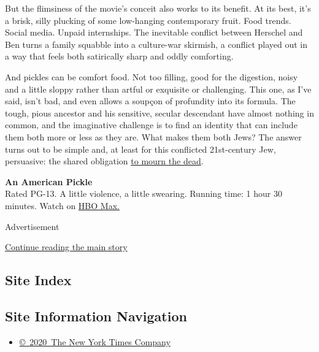 But the flimsiness of the movie's conceit also works to its benefit. At
its best, it's a brisk, silly plucking of some low-hanging contemporary
fruit. Food trends. Social media. Unpaid internships. The inevitable
conflict between Herschel and Ben turns a family squabble into a
culture-war skirmish, a conflict played out in a way that feels both
satirically sharp and oddly comforting.

And pickles can be comfort food. Not too filling, good for the
digestion, noisy and a little sloppy rather than artful or exquisite or
challenging. This one, as I've said, isn't bad, and even allows a
soupçon of profundity into its formula. The tough, pious ancestor and
his sensitive, secular descendant have almost nothing in common, and the
imaginative challenge is to find an identity that can include them both
more or less as they are. What makes them both Jews? The answer turns
out to be simple and, at least for this conflicted 21st-century Jew,
persuasive: the shared obligation
\href{https://www.myjewishlearning.com/article/text-of-the-mourners-kaddish/}{to
mourn the dead}.

\textbf{An American Pickle}\\
Rated PG-13. A little violence, a little swearing. Running time: 1 hour
30 minutes. Watch on \href{https://www.hbomax.com/}{HBO Max.}

Advertisement

\protect\hyperlink{after-bottom}{Continue reading the main story}

\hypertarget{site-index}{%
\subsection{Site Index}\label{site-index}}

\hypertarget{site-information-navigation}{%
\subsection{Site Information
Navigation}\label{site-information-navigation}}

\begin{itemize}
\tightlist
\item
  \href{https://help.nytimes.com/hc/en-us/articles/115014792127-Copyright-notice}{©~2020~The
  New York Times Company}
\end{itemize}

